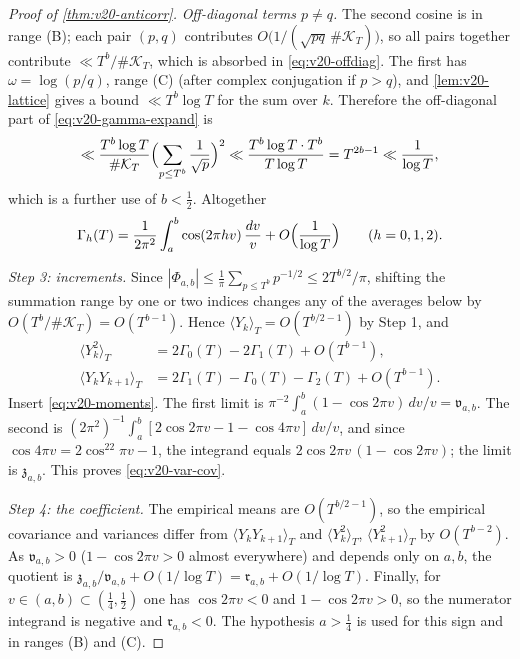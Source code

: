\documentclass[11pt,a4paper]{article}
\numberwithin{equation}{section}
\theoremstyle{definition}
\theoremstyle{remark}
\begin{document}
\begin{proof}[Proof of \cref{thm:v20-anticorr}]
\emph{Off-diagonal terms $p\ne q$.} The second cosine is in range (B); each pair $(p,q)$ contributes $O\bigl(1/(\sqrt{pq}\,\#\mathcal K_T)\bigr)$, so all pairs together contribute $\ll T^b/\#\mathcal K_T$, which is absorbed in \eqref{eq:v20-offdiag}. The first has $\omega=\log(p/q)$, range (C) (after complex conjugation if $p>q$), and \cref{lem:v20-lattice} gives a bound $\ll T^b\log T$ for the sum over $k$. Therefore the off-diagonal part of \eqref{eq:v20-gamma-expand} is
\begin{equation}\label{eq:v20-offdiag}
 \ll\frac{T^b\log T}{\#\mathcal K_T}\Bigl(\sum_{p\le T^b}\frac1{\sqrt p}\Bigr)^2\ll\frac{T^b\log T\cdot T^b}{T\log T}=T^{2b-1}\ll\frac1{\log T},
\end{equation}
which is a further use of $b<\frac12$. Altogether
\begin{equation}\label{eq:v20-moments}
 \Gamma_h(T)=\frac1{2\pi^2}\int_a^b\cos(2\pi hv)\,\frac{dv}v+O\Bigl(\frac1{\log T}\Bigr)\qquad(h=0,1,2).
\end{equation}

\emph{Step 3: increments.} Since $|\Phi_{a,b}|\le\frac1\pi\sum_{p\le T^b}p^{-1/2}\le2T^{b/2}/\pi$, shifting the summation range by one or two indices changes any of the averages below by $O(T^b/\#\mathcal K_T)=O(T^{b-1})$. Hence $\langle Y_k\rangle_T=O(T^{b/2-1})$ by Step 1, and
\begin{align}
 \langle Y_k^2\rangle_T&=2\Gamma_0(T)-2\Gamma_1(T)+O(T^{b-1}),\\
 \langle Y_kY_{k+1}\rangle_T&=2\Gamma_1(T)-\Gamma_0(T)-\Gamma_2(T)+O(T^{b-1}).
\end{align}
Insert \eqref{eq:v20-moments}. The first limit is $\pi^{-2}\int_a^b(1-\cos 2\pi v)\,dv/v=\mathfrak v_{a,b}$. The second is $(2\pi^2)^{-1}\allowbreak\int_a^b[2\cos2\pi v-1-\cos4\pi v]\,dv/v$, and since $\cos4\pi v=2\cos^22\pi v-1$, the integrand equals $2\cos2\pi v\,(1-\cos2\pi v)$; the limit is $\mathfrak z_{a,b}$. This proves \eqref{eq:v20-var-cov}.

\emph{Step 4: the coefficient.} The empirical means are $O(T^{b/2-1})$, so the empirical covariance and variances differ from $\langle Y_kY_{k+1}\rangle_T$ and $\langle Y_k^2\rangle_T$, $\langle Y_{k+1}^2\rangle_T$ by $O(T^{b-2})$. As $\mathfrak v_{a,b}>0$ ($1-\cos2\pi v>0$ almost everywhere) and depends only on $a,b$, the quotient is $\mathfrak z_{a,b}/\mathfrak v_{a,b}+O(1/\log T)=\mathfrak r_{a,b}+O(1/\log T)$. Finally, for $v\in(a,b)\subset(\frac14,\frac12)$ one has $\cos2\pi v<0$ and $1-\cos2\pi v>0$, so the numerator integrand is negative and $\mathfrak r_{a,b}<0$. The hypothesis $a>\frac14$ is used for this sign and in ranges (B) and (C).
\end{proof}
\end{document}
